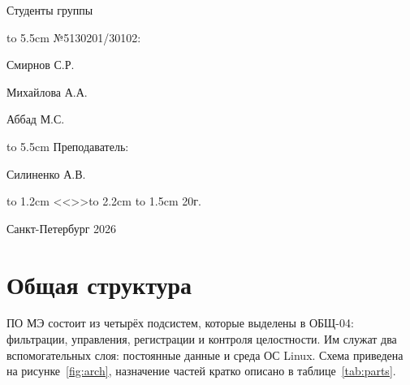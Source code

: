 \documentclass[12pt,a4paper,final]{article}
\begin{document}
	\begin{flushleft}
		Студенты группы
	\end{flushleft}
	\vspace{-0.55cm}
	\begin{flushleft}
		\hbox to 5.5cm {№5130201/30102:\quad \hrulefill}
	\end{flushleft}
	\begin{flushright}
		\vspace{-1.45cm}
		Смирнов С.Р.
	\end{flushright}
	\begin{flushright}

		Михайлова А.А.
	\end{flushright}
	\begin{flushright}

		Аббад М.С.
	\end{flushright}
	\vspace{1cm}
	\begin{flushleft}
		\hbox to 5.5cm {Преподаватель:\quad \hrulefill}
	\end{flushleft}
	\begin{flushright}
		\vspace{-1.5cm}
		Силиненко А.В.
	\end{flushright}
	\begin{flushright}
		\vspace{1cm}
		\hspace{5cm}\hbox to 1.2cm {<<\hrulefill>>}\hbox to 2.2cm {\hrulefill }\hbox to 1.5cm { 20\hrulefill г.}
	\end{flushright}
	\begin{center}
		\vspace{4cm}
		Санкт-Петербург 2026
	\end{center}
	\newpage

\tableofcontents
\clearpage

\section{Общая структура}\label{sec:overview}

ПО МЭ состоит из четырёх подсистем, которые выделены в ОБЩ-04: фильтрации,
управления, регистрации и контроля целостности. Им служат два вспомогательных
слоя: постоянные данные и среда ОС Linux. Схема приведена на
рисунке~\ref{fig:arch}, назначение частей кратко описано в
таблице~\ref{tab:parts}.
\end{document}
